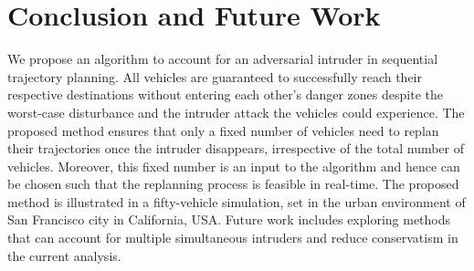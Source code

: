\section{Conclusion and Future Work}
We propose an algorithm to account for an adversarial intruder in sequential trajectory planning. All vehicles are guaranteed to successfully reach their respective destinations without entering each other's danger zones despite the worst-case disturbance and the intruder attack the vehicles could experience. The proposed method ensures that only a fixed number of vehicles need to replan their trajectories once the intruder disappears, irrespective of the total number of vehicles. Moreover, this fixed number is an input to the algorithm and hence can be chosen such that the replanning process is feasible in real-time. The proposed method is illustrated in a fifty-vehicle simulation, set in the urban environment of San Francisco city in California, USA. Future work includes exploring methods that can account for multiple simultaneous intruders and reduce conservatism in the current analysis.